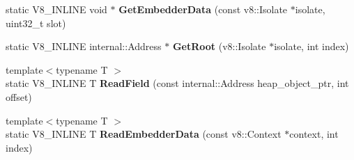\begin{DoxyCompactItemize}
\item 
\mbox{\label{classv8_1_1internal_1_1Internals_ab53d3d4ef80770cb3e7d10effed86d10}} 
static V8\+\_\+\+I\+N\+L\+I\+NE void $\ast$ {\bfseries Get\+Embedder\+Data} (const v8\+::\+Isolate $\ast$isolate, uint32\+\_\+t slot)
\item 
\mbox{\label{classv8_1_1internal_1_1Internals_a2bee569fd8bb0a97470679d88e22dc30}} 
static V8\+\_\+\+I\+N\+L\+I\+NE internal\+::\+Address $\ast$ {\bfseries Get\+Root} (v8\+::\+Isolate $\ast$isolate, int index)
\item 
\mbox{\label{classv8_1_1internal_1_1Internals_a9a0239f7b97b5057d2a3c7137a3297b3}} 
{\footnotesize template$<$typename T $>$ }\\static V8\+\_\+\+I\+N\+L\+I\+NE T {\bfseries Read\+Field} (const internal\+::\+Address heap\+\_\+object\+\_\+ptr, int offset)
\item 
\mbox{\label{classv8_1_1internal_1_1Internals_a98cf4d5b60b963cc544cdd3aeda52335}} 
{\footnotesize template$<$typename T $>$ }\\static V8\+\_\+\+I\+N\+L\+I\+NE T {\bfseries Read\+Embedder\+Data} (const v8\+::\+Context $\ast$context, int index)
\end{DoxyCompactItemize}
